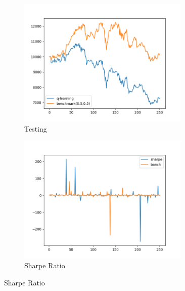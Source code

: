 \begin{figure}[H]
\begin{subfigure}{.5\textwidth}
\end{subfigure}%
\vspace{0.4cm}
\begin{subfigure}{.5\textwidth}%
\centering
\includegraphics[clip, width=0.9\textwidth]{Graphics/NEW_TRY1TEST.png} \caption{Testing} 
\end{subfigure}%
\begin{subfigure}{.5\textwidth}%
\centering
\includegraphics[clip, width=0.9\textwidth]{Graphics/NEW_TRY1TESTS.png} \caption{Sharpe Ratio}
\end{subfigure}%
\end{figure}

